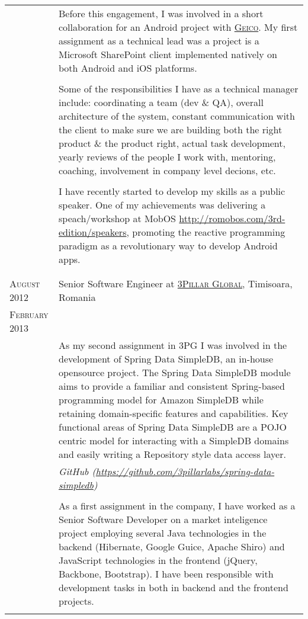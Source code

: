 \documentclass[a4paper,10pt]{article}
\begin{document}
\begin{longtable}{p{2.5cm}|p{11cm}}
& \footnotesize{Before this engagement, I was involved in a short collaboration for an Android project with \textsc{\href{https://www.geico.com/}{Geico}}. My first assignment as a technical lead was a project is a Microsoft SharePoint client implemented natively on both Android and iOS platforms.}\\ \\
& \footnotesize{Some of the responsibilities I have as a technical manager include: coordinating a team (dev \& QA), overall architecture of the system, constant communication with the client to make sure we are building both the right product \& the product right, actual task development, yearly reviews of the people I work with, mentoring, coaching, involvement in company level decions, etc.}\\ \\
& \footnotesize{I have recently started to develop my skills as a public speaker. One of my achievements was delivering a speach/workshop at MobOS \url{http://romobos.com/3rd-edition/speakers}, promoting the reactive programming paradigm as a revolutionary way to develop Android apps.}\\ \\
\multicolumn{2}{c}{} \\ 

 \raggedleft \textsc{August 2012} & Senior Software Engineer at
 \textsc{\href{http://www.3pillarglobal.com/}{3Pillar Global}}, Timisoara, Romania
 \\\raggedleft \textsc{February 2013}\\
& \footnotesize{As my second assignment in 3PG I was involved in the development of Spring Data SimpleDB, an in-house opensource project. The Spring Data SimpleDB module aims to provide a familiar and consistent Spring-based programming model for Amazon SimpleDB while retaining domain-specific features and capabilities. Key functional areas of Spring Data SimpleDB are a POJO centric model for interacting with a SimpleDB domains and easily writing a Repository style data access layer.}\\
& \footnotesize{\emph{GitHub (\url{https://github.com/3pillarlabs/spring-data-simpledb})}} \\ \\
& \footnotesize{As a first assignment in the company, I have worked as a Senior Software Developer on a market inteligence project employing several Java technologies in the backend (Hibernate, Google Guice, Apache Shiro) and JavaScript technologies in the
frontend (jQuery, Backbone, Bootstrap). I have been responsible with development tasks in both in backend and the frontend projects.}\\
\multicolumn{2}{c}{} \\ 


\end{longtable}
\end{document}
